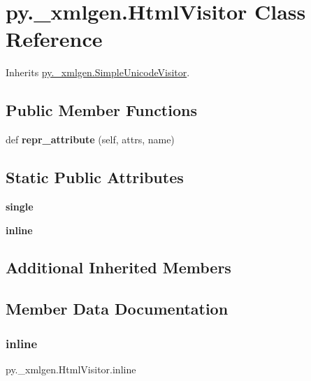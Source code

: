 \hypertarget{classpy_1_1__xmlgen_1_1_html_visitor}{}\section{py.\+\_\+xmlgen.\+Html\+Visitor Class Reference}
\label{classpy_1_1__xmlgen_1_1_html_visitor}


Inherits \hyperlink{classpy_1_1__xmlgen_1_1_simple_unicode_visitor}{py.\+\_\+xmlgen.\+Simple\+Unicode\+Visitor}.

\subsection*{Public Member Functions}
\begin{DoxyCompactItemize}
\item 
\mbox{\label{classpy_1_1__xmlgen_1_1_html_visitor_a7068d8445c49fba9a1d0db1e5590e8eb}} 
def {\bfseries repr\+\_\+attribute} (self, attrs, name)
\end{DoxyCompactItemize}
\subsection*{Static Public Attributes}
\begin{DoxyCompactItemize}
\item 
{\bfseries single}
\item 
{\bfseries inline}
\end{DoxyCompactItemize}
\subsection*{Additional Inherited Members}


\subsection{Member Data Documentation}
\mbox{\label{classpy_1_1__xmlgen_1_1_html_visitor_a79c0f642a99fa64d49e85fbf16c14666}} 
\subsubsection{\texorpdfstring{inline}{inline}}
{\footnotesize\ttfamily py.\+\_\+xmlgen.\+Html\+Visitor.\+inline\hspace{0.3cm}{\ttfamily [static]}}

